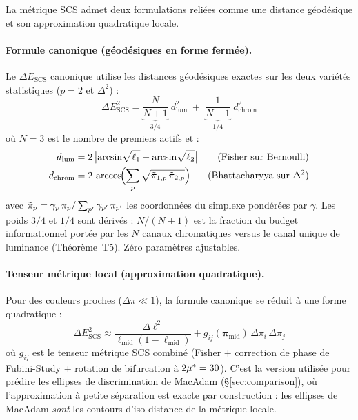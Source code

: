 \documentclass[12pt,a4paper]{article}
\begin{document}
La m\'etrique SCS admet deux formulations reli\'ees comme une distance
g\'eod\'esique et son approximation quadratique locale.

\paragraph{Formule canonique (g\'eod\'esiques en forme ferm\'ee).}
Le $\Delta E_{\mathrm{SCS}}$ canonique utilise les distances
g\'eod\'esiques exactes sur les deux vari\'et\'es statistiques ($p=2$
et $\Delta^2$) :
\begin{equation}
\Delta E_{\mathrm{SCS}}^2 =
  \underbrace{\frac{N}{N+1}}_{3/4}\; d_{\mathrm{lum}}^2 \;+\;
  \underbrace{\frac{1}{N+1}}_{1/4}\; d_{\mathrm{chrom}}^2
\label{eq:de_canonical}
\end{equation}
o\`u $N = 3$ est le nombre de premiers actifs et :
\begin{align}
  d_{\mathrm{lum}} &= 2\,\bigl|\arcsin\!\sqrt{\ell_1}
    - \arcsin\!\sqrt{\ell_2}\bigr|
    & \text{(Fisher sur Bernoulli)} \\
  d_{\mathrm{chrom}} &= 2\,\arccos\!\Bigl(
    \sum_{p} \sqrt{\tilde{\pi}_{1,p}\,\tilde{\pi}_{2,p}}\Bigr)
    & \text{(Bhattacharyya sur $\Delta^2$)}
\end{align}
avec $\tilde{\pi}_p = \gamma_{p}\,\pi_p / \sum_{p'}\gamma_{p'}\,\pi_{p'}$
les coordonn\'ees du simplexe pond\'er\'ees par $\gamma$. Les poids
$3/4$ et $1/4$ sont d\'eriv\'es : $N/(N+1)$ est la fraction du budget
informationnel port\'ee par les $N$ canaux chromatiques versus le canal
unique de luminance (Th\'eor\`eme~T5). Z\'ero param\`etres ajustables.

\paragraph{Tenseur m\'etrique local (approximation quadratique).}
Pour des couleurs proches ($\Delta\pi \ll 1$), la formule canonique se
r\'eduit \`a une forme quadratique :
\begin{equation}
\Delta E_{\mathrm{SCS}}^2 \approx
  \frac{\Delta\ell^2}{\ell_{\mathrm{mid}}(1-\ell_{\mathrm{mid}})}
  + g_{ij}(\bm{\pi}_{\mathrm{mid}}) \, \Delta\pi_i \, \Delta\pi_j
\label{eq:de_local}
\end{equation}
o\`u $g_{ij}$ est le tenseur m\'etrique SCS combin\'e (Fisher +
correction de phase de Fubini-Study + rotation de bifurcation \`a
$2{\mu^{*}} = 30$). C'est la version utilis\'ee pour pr\'edire les
ellipses de discrimination de MacAdam (\S\ref{sec:comparison}), o\`u
l'approximation \`a petite s\'eparation est exacte par construction :
les ellipses de MacAdam \emph{sont} les contours d'iso-distance de la
m\'etrique locale.
\end{document}
